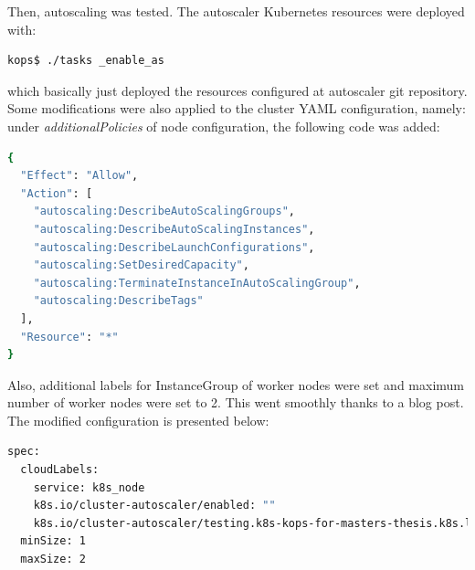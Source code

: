 Then, autoscaling was tested. The autoscaler Kubernetes resources were deployed with:
\begin{lstlisting}[basicstyle=\tiny,caption={TODO},captionpos=b,language=Bash,xleftmargin=1cm]
kops$ ./tasks _enable_as
\end{lstlisting}
which basically just deployed the resources configured at autoscaler git repository\cite{as-github}. Some modifications were also applied to the cluster YAML configuration, namely: under \textit{additionalPolicies} of node configuration, the following code was added:
\begin{lstlisting}[basicstyle=\tiny,caption={TODO},captionpos=b,language=Bash,xleftmargin=1cm]
{
  "Effect": "Allow",
  "Action": [
    "autoscaling:DescribeAutoScalingGroups",
    "autoscaling:DescribeAutoScalingInstances",
    "autoscaling:DescribeLaunchConfigurations",
    "autoscaling:SetDesiredCapacity",
    "autoscaling:TerminateInstanceInAutoScalingGroup",
    "autoscaling:DescribeTags"
  ],
  "Resource": "*"
}
\end{lstlisting}
Also, additional labels for InstanceGroup of worker nodes were set and maximum number of worker nodes were set to 2. This went smoothly thanks to a blog post\cite{as-blog}. The modified configuration is presented below:
\begin{lstlisting}[basicstyle=\tiny,caption={TODO},captionpos=b,language=Bash,xleftmargin=1cm]
spec:
  cloudLabels:
    service: k8s_node
    k8s.io/cluster-autoscaler/enabled: ""
    k8s.io/cluster-autoscaler/testing.k8s-kops-for-masters-thesis.k8s.local: ""
  minSize: 1
  maxSize: 2
\end{lstlisting}


